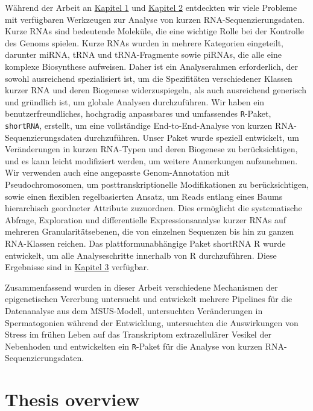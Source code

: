 \documentclass[12pt,twoside]{reedthesis}
\begin{document}
Während der Arbeit an \protect\hyperlink{chapter1}{Kapitel 1} und \protect\hyperlink{chapter2}{Kapitel 2} entdeckten wir viele Probleme mit verfügbaren Werkzeugen zur Analyse von kurzen RNA-Sequenzierungsdaten. Kurze RNAs sind bedeutende Moleküle, die eine wichtige Rolle bei der Kontrolle des Genoms spielen. Kurze RNAs wurden in mehrere Kategorien eingeteilt, darunter miRNA, tRNA und tRNA-Fragmente sowie piRNAs, die alle eine komplexe Biosynthese aufweisen. Daher ist ein Analyserahmen erforderlich, der sowohl ausreichend spezialisiert ist, um die Spezifitäten verschiedener Klassen kurzer RNA und deren Biogenese widerzuspiegeln, als auch ausreichend generisch und gründlich ist, um globale Analysen durchzuführen. Wir haben ein benutzerfreundliches, hochgradig anpassbares und umfassendes \texttt{R}-Paket, \texttt{shortRNA}, erstellt, um eine vollständige End-to-End-Analyse von kurzen RNA-Sequenzierungsdaten durchzuführen. Unser Paket wurde speziell entwickelt, um Veränderungen in kurzen RNA-Typen und deren Biogenese zu berücksichtigen, und es kann leicht modifiziert werden, um weitere Anmerkungen aufzunehmen. Wir verwenden auch eine angepasste Genom-Annotation mit Pseudochromosomen, um posttranskriptionelle Modifikationen zu berücksichtigen, sowie einen flexiblen regelbasierten Ansatz, um Reads entlang eines Baums hierarchisch geordneter Attribute zuzuordnen. Dies ermöglicht die systematische Abfrage, Exploration und differentielle Expressionsanalyse kurzer RNAs auf mehreren Granularitätsebenen, die von einzelnen Sequenzen bis hin zu ganzen RNA-Klassen reichen. Das plattformunabhängige Paket shortRNA R wurde entwickelt, um alle Analyseschritte innerhalb von R durchzuführen. Diese Ergebnisse sind in \protect\hyperlink{chapter3}{Kapitel 3} verfügbar.

Zusammenfassend wurden in dieser Arbeit verschiedene Mechanismen der epigenetischen Vererbung untersucht und entwickelt mehrere Pipelines für die Datenanalyse aus dem MSUS-Modell, untersuchten Veränderungen in Spermatogonien während der Entwicklung, untersuchten die Auswirkungen von Stress im frühen Leben auf das Transkriptom extrazellulärer Vesikel der Nebenhoden und entwickelten ein \texttt{R}-Paket für die Analyse von kurzen RNA-Sequenzierungsdaten.

\hypertarget{overview}{%
\chapter*{Thesis overview}\label{overview}}
\end{document}
